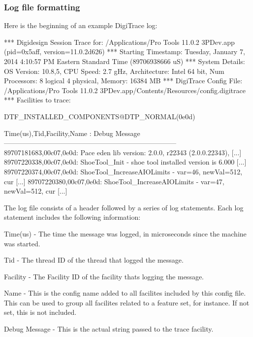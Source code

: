 \hypertarget{a00834_digitrace__logfiles__format}{}\subsubsection{Log file formatting}\label{a00834_digitrace__logfiles__format}
 Here is the beginning of an example Digi\+Trace log\+: \begin{DoxyVerb}*** Digidesign Session Trace for:	/Applications/Pro Tools 11.0.2 3PDev.app (pid=0x5aff, version=11.0.2d626)
*** Starting Timestamp:			Tuesday, January 7, 2014 4:10:57 PM Eastern Standard Time (89706938666 uS)
*** System Details:			OS Version: 10.8,5, CPU Speed:  2.7 gHz, Architecture: Intel 64 bit, Num Processors: 8 logical 4 physical, Memory: 16384 MB
*** DigiTrace Config File:		/Applications/Pro Tools 11.0.2 3PDev.app/Contents/Resources/config.digitrace
*** Facilities to trace:

DTF_INSTALLED_COMPONENTS@DTP_NORMAL(0e0d)

Time(us),Tid,Facility,Name : Debug Message
---------------------------------------------------------------------------
89707181683,00c07,0e0d: Pace eden lib version: 2.0.0, r22343 (2.0.0.22343),  [...]
89707220338,00c07,0e0d: ShoeTool_Init - shoe tool installed version is 6.000 [...]
89707220374,00c07,0e0d: ShoeTool_IncreaseAIOLimits - var=46, newVal=512, cur [...]
89707220380,00c07,0e0d: ShoeTool_IncreaseAIOLimits - var=47, newVal=512, cur [...]	 \end{DoxyVerb}


 The log file consists of a header followed by a series of log statements. Each log statement includes the following information\+:

 
\begin{DoxyItemize}
\item Time(us) -\/ The time the message was logged, in microseconds since the machine was started.  
\item Tid -\/ The thread ID of the thread that logged the message.  
\item Facility -\/ The Facility ID of the facility that\textquotesingle{}s logging the message.  
\item Name -\/ This is the config name added to all facilites included by this config file. This can be used to group all facilites related to a feature set, for instance. If not set, this is not included.  
\item Debug Message -\/ This is the actual string passed to the trace facility.  
\end{DoxyItemize}



